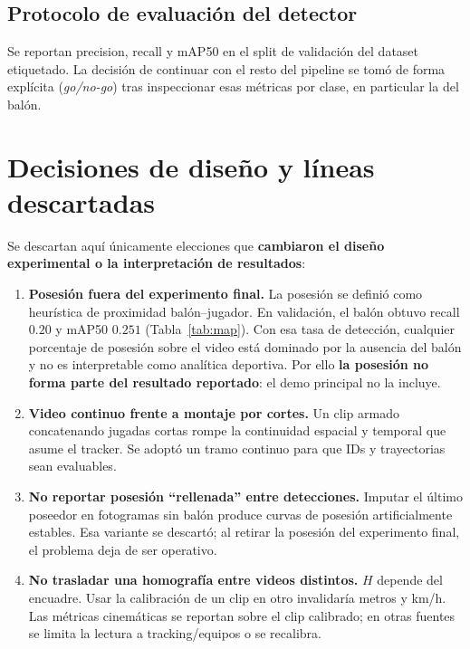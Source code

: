 \documentclass[conference]{IEEEtran}
\begin{document}
\subsection{Protocolo de evaluación del detector}
Se reportan precision, recall y mAP50 en el split de validación del dataset etiquetado. La decisión de continuar con el resto del pipeline se tomó de forma explícita (\emph{go/no-go}) tras inspeccionar esas métricas por clase, en particular la del balón.

\section{Decisiones de diseño y líneas descartadas}
\label{sec:descartes}

Se descartan aquí únicamente elecciones que \textbf{cambiaron el diseño experimental o la interpretación de resultados}:

\begin{enumerate}[leftmargin=*,itemsep=3pt]
  \item \textbf{Posesión fuera del experimento final.}
  La posesión se definió como heurística de proximidad balón--jugador. En validación, el balón obtuvo recall $0.20$ y mAP50 $0.251$ (Tabla~\ref{tab:map}). Con esa tasa de detección, cualquier porcentaje de posesión sobre el video está dominado por la ausencia del balón y no es interpretable como analítica deportiva. Por ello \textbf{la posesión no forma parte del resultado reportado}: el demo principal no la incluye.

  \item \textbf{Video continuo frente a montaje por cortes.}
  Un clip armado concatenando jugadas cortas rompe la continuidad espacial y temporal que asume el tracker. Se adoptó un tramo continuo para que IDs y trayectorias sean evaluables.

  \item \textbf{No reportar posesión ``rellenada'' entre detecciones.}
  Imputar el último poseedor en fotogramas sin balón produce curvas de posesión artificialmente estables. Esa variante se descartó; al retirar la posesión del experimento final, el problema deja de ser operativo.

  \item \textbf{No trasladar una homografía entre videos distintos.}
  $H$ depende del encuadre. Usar la calibración de un clip en otro invalidaría metros y km/h. Las métricas cinemáticas se reportan sobre el clip calibrado; en otras fuentes se limita la lectura a tracking/equipos o se recalibra.
\end{enumerate}
\end{document}
